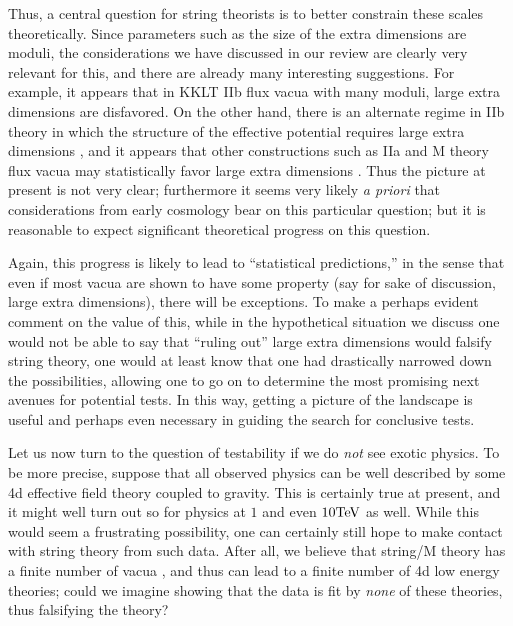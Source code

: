 \documentclass[aps,amsfonts]{ar2e}
\begin{document}
Thus, a central question for string theorists is to better constrain
these scales theoretically.  Since parameters such as the size of the
extra dimensions are moduli, the considerations we have discussed in
our review are clearly very relevant for this, and there are already
many interesting suggestions.  For example, it appears that in
KKLT IIb flux vacua with many moduli, large extra dimensions are
disfavored.  On the other hand, there is an alternate regime in IIb
theory in which the structure of the effective potential requires
large extra dimensions \cite{Balasubramanian:2005zx}, and it appears
that other constructions such as IIa and M theory flux vacua may
statistically favor large extra dimensions
\cite{DeWolfe:2005uu,Acharya:2005ez}.
Thus the picture at present is not very clear; furthermore it seems
very likely {\it a priori} that considerations from early cosmology
bear on this particular question; but it is reasonable to expect
significant theoretical progress on this question.

Again, this progress is likely to lead to ``statistical predictions,''
in the sense that even if most vacua are shown to have some property
(say for sake of discussion, large extra dimensions), there will be
exceptions.  To make a perhaps evident comment on the value of this,
while in the hypothetical situation we discuss one would not be able to say
that ``ruling out'' large extra dimensions would falsify string
theory, one would at least know that one had drastically narrowed down
the possibilities, allowing one to go on to determine the most
promising next avenues for potential tests.  In this way, getting a
picture of the landscape is useful and perhaps even necessary
in guiding the search for conclusive tests.

Let us now turn to the question of testability if we do \emph{not} see
exotic physics. To be more precise, suppose that all observed physics
can be well described by some 4d effective field theory
coupled to gravity.  This is certainly true at present, and it might
well turn out so for physics at $1$ and even $10 {\rm TeV}$ as well.
While this would seem a frustrating possibility, one can certainly
still hope to make contact with string theory from such data.  After all,
we believe that string/M theory has a finite number of vacua
\cite{Acharya:2006zw},
and thus can lead to a finite number of 4d low energy theories;
could we imagine showing that the data is fit by \emph{none} of these
theories, thus falsifying the theory?
\end{document}

